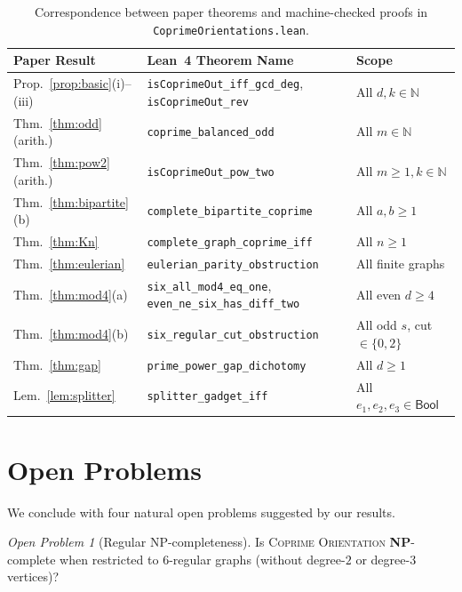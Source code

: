 \documentclass[11pt,a4paper]{article}
\theoremstyle{definition}
\theoremstyle{remark}
\newtheorem{problem}[theorem]{Open Problem}
\newcommand{\N}{\mathbb{N}}
\begin{document}
\begin{table}[ht]
\centering
\small
\begin{tabular}{@{}lll@{}}
\toprule
\textbf{Paper Result} & \textbf{Lean~4 Theorem Name} & \textbf{Scope} \\
\midrule
Prop.~\ref{prop:basic}(i)--(iii) & \texttt{isCoprimeOut\_iff\_gcd\_deg}, \texttt{isCoprimeOut\_rev} & All $d, k \in \N$ \\
Thm.~\ref{thm:odd} (arith.) & \texttt{coprime\_balanced\_odd} & All $m \in \N$ \\
Thm.~\ref{thm:pow2} (arith.) & \texttt{isCoprimeOut\_pow\_two} & All $m \ge 1, k \in \N$ \\
Thm.~\ref{thm:bipartite}(b) & \texttt{complete\_bipartite\_coprime} & All $a, b \ge 1$ \\
Thm.~\ref{thm:Kn} & \texttt{complete\_graph\_coprime\_iff} & All $n \ge 1$ \\
Thm.~\ref{thm:eulerian} & \texttt{eulerian\_parity\_obstruction} & All finite graphs \\
Thm.~\ref{thm:mod4}(a) & \texttt{six\_all\_mod4\_eq\_one}, \texttt{even\_ne\_six\_has\_diff\_two} & All even $d \ge 4$ \\
Thm.~\ref{thm:mod4}(b) & \texttt{six\_regular\_cut\_obstruction} & All odd $s$, cut $\in \{0,2\}$ \\
Thm.~\ref{thm:gap} & \texttt{prime\_power\_gap\_dichotomy} & All $d \ge 1$ \\
Lem.~\ref{lem:splitter} & \texttt{splitter\_gadget\_iff} & All $e_1, e_2, e_3 \in \mathsf{Bool}$ \\
\bottomrule
\end{tabular}
\caption{Correspondence between paper theorems and machine-checked proofs in \texttt{CoprimeOrientations.lean}.}
\label{tab:lean}
\end{table}

\section{Open Problems}

We conclude with four natural open problems suggested by our results.

\begin{problem}[Regular NP-completeness]
Is \textsc{Coprime Orientation} \textbf{NP}-complete when restricted to $6$-regular graphs (without degree-$2$ or degree-$3$ vertices)?
\end{problem}
\end{document}

